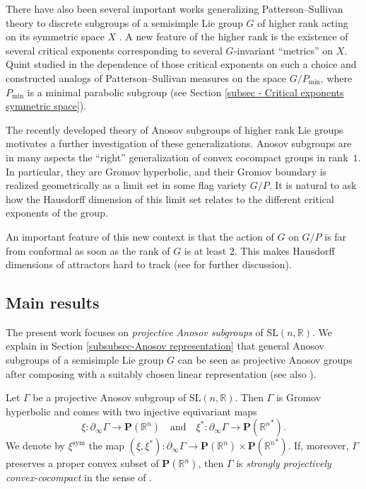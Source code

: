 \documentclass[11pt]{article}
\numberwithin{equation}{section}
\newcommand{\quand}{\quad\text{and}\quad}
\newcommand{\sym}{\mathrm{sym}}
\theoremstyle{definition}
\newcommand{\proj}{\mathbf{P}}
\newcommand{\R}{\mathbb{R}}
\newcommand{\SL}{\mathrm{SL}}
\let\G\Gamma
\begin{document}
There have also been several important works generalizing Patterson--Sullivan theory to discrete subgroups of a semisimple Lie group $G$ of higher rank acting on its symmetric space $X$ \cite{link2005measures,quint2002mesures}. A new feature of the higher rank is the existence of several critical exponents corresponding to several $G$-invariant ``metrics'' on $X$. Quint studied in \cite{quint2002mesures} the dependence of those critical exponents on such a choice and constructed analogs of Patterson--Sullivan measures on the space $G/P_{\min}$, where $P_{\min}$ is a minimal parabolic subgroup (see Section \ref{subsec - Critical exponents symmetric space}).

The recently developed theory of Anosov subgroups of higher rank Lie groups motivates a further investigation of these generalizations. Anosov subgroups are in many aspects the ``right'' generalization of convex cocompact groups in rank~$1$. In particular, they are Gromov hyperbolic, and their Gromov boundary is realized geometrically as a limit set in some flag variety $G/P$. It is natural to ask how the Hausdorff dimension of this limit set relates to the different critical exponents of the group.

An important feature of this new context is that the action of $G$ on $G/P$ is far from conformal as soon as the rank of $G$ is at least $2$. This makes Hausdorff dimensions of attractors hard to track (see \cite{PSW19} for further discussion).

\subsection{Main results}

The present work focuses on \emph{projective Anosov subgroups} of $\SL(n,\R)$. We explain in Section \ref{subsubsec-Anosov representation} that general Anosov subgroups of a semisimple Lie group $G$ can be seen as projective Anosov groups after composing with a suitably chosen linear representation (see also \cite[\S 3.3]{gueritaud20017anosov}).

Let $\G$ be a projective Anosov subgroup of $\SL(n,\R)$. Then $\G$ is Gromov hyperbolic and comes with two injective equivariant maps
\[
\xi : \partial_\infty \G \to \proj (\R^n)\quand \xi^* : \partial_\infty \G \to \proj ({\R^n}^*).
\]
We denote by $\xi^{\sym}$ the map $(\xi,\xi^*): \partial_\infty \G \to \proj (\R^n) \times \proj({\R^n}^*)$. If, moreover, $\G$ preserves a proper convex subset of $\proj(\R^n)$, then $\G$ is \emph{strongly projectively convex-cocompact} in the sense of \cite{DGK}.
\end{document}
